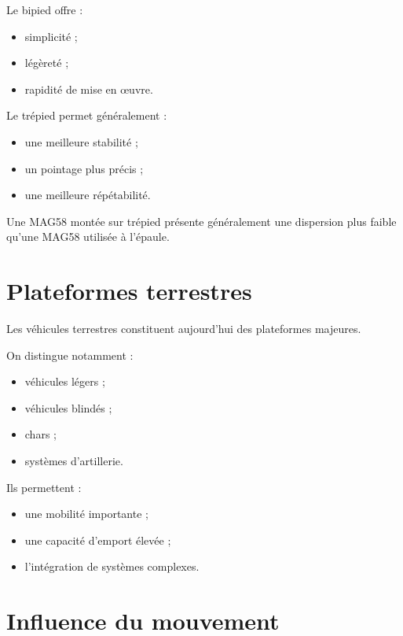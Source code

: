 Le bipied offre :

\begin{itemize}
    \item simplicité ;
    \item légèreté ;
    \item rapidité de mise en œuvre.
\end{itemize}

Le trépied permet généralement :

\begin{itemize}
    \item une meilleure stabilité ;
    \item un pointage plus précis ;
    \item une meilleure répétabilité.
\end{itemize}

\begin{exemple}

Une MAG58 montée sur trépied présente généralement une dispersion plus faible
qu'une MAG58 utilisée à l'épaule.

\end{exemple}

\section{Plateformes terrestres}

Les véhicules terrestres constituent aujourd'hui des plateformes majeures.

On distingue notamment :

\begin{itemize}
    \item véhicules légers ;
    \item véhicules blindés ;
    \item chars ;
    \item systèmes d'artillerie.
\end{itemize}

Ils permettent :

\begin{itemize}
    \item une mobilité importante ;
    \item une capacité d'emport élevée ;
    \item l'intégration de systèmes complexes.
\end{itemize}

\section{Influence du mouvement}

